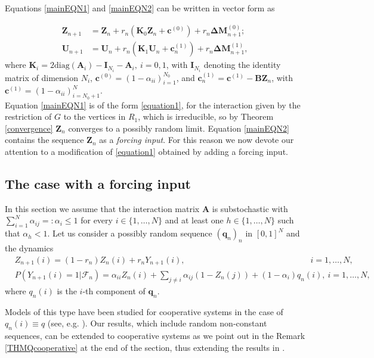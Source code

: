 \documentclass[article,12pt]{article}
\theoremstyle{plain}
\theoremstyle{definition}
\theoremstyle{remark}
\numberwithin{equation}{section}
\numberwithin{theorem}{section}
\begin{document}
		Equations \eqref{mainEQN1} and \eqref{mainEQN2} can be written in vector form as  
		
		\begin{align}\label{RED}
			\mathbf{Z}_{n+1}&=\mathbf{Z}_n+ r_n (\mathbf{K}_0\mathbf{Z}_n+\mathbf{c}^{(0)})+ r_n \mathbf{\Delta M}^{(0)}_{n+1};\\
			\mathbf{U}_{n+1}&=\mathbf{U}_n +r_n (\mathbf{K}_1\mathbf{U}_n+\mathbf{c}^{(1)}_n)+ r_n\mathbf{\Delta M}^{(1)}_{n+1},
		\end{align}
		where $\mathbf{K}_i=2 \mathrm{diag}(\mathbf{A}_i)-{\mathrm{\mathbf{I}}}_{N_i}-\mathbf{A}_i,\ i=0,1$, with  $\mathrm{\mathbf{I}}_{N_i}$ denoting the identity matrix of dimension $N_i$, $\mathbf{c}^{(0)}=(1-\alpha_{ii})_{i=1}^{N_0}$, and $\mathbf{c}_n^{(1)}=\mathbf{c}^{(1)}-\mathbf{B}\mathbf{Z}_n$, with $\mathbf{c}^{(1)}=(1-\alpha_{ii})_{i=N_0+1}^N$.\\
		Equation \eqref{mainEQN1} is of the form \eqref{equation1}, for the interaction given by the restriction of $G$ to the vertices in $R_1$, which is irreducible, so by Theorem \ref{convergence} $\mathbf{Z}_n$ converges to a possibly random limit. Equation \eqref{mainEQN2} contains the sequence $\mathbf{Z}_n$ as a {\em forcing input}. For this reason we now devote our attention to a modification of \eqref{equation1} obtained by adding a forcing input.
		
		\subsection{The case with a forcing input}\label{sec:competitiveforce}
		In this section we assume that the interaction matrix $\mathbf{A}$ is substochastic with $\sum_{i=1}^N\alpha_{ij}=:\alpha_{i}\leq 1$ for every $i\in \{1,\ldots, N\}$ and  at least one $h\in \{1,\ldots, N\}$ such that $\alpha_h<1$. Let us consider a possibly random sequence $(\mathbf{q}_n)_n$ in  $[0,1]^N$ and the dynamics
		\begin{align}\label{equation3}
			&Z_{n+1}(i)=(1-r_n)Z_n(i) + r_n Y_{n+1}(i) ,\qquad\qquad\qquad\qquad\qquad\qquad\qquad\quad i=1,\ldots, N,\\
			&P\left(Y_{n+1}(i)=1|\mathcal{F}_n\right) = \alpha_{ii}Z_n(i)+ \sum_{j\neq i}\alpha_{ij} \left(1-Z_n(j)\right)+(1-\alpha_i)q_{n}(i), \ i=1,\ldots, N,\nonumber
		\end{align}  
		where $q_{n}(i)$ is the $i$-th component of $\mathbf{q}_n$.                                              
		
		
		Models of this type have been  studied for cooperative systems in the case of $q_{n}(i) \equiv q$ (see, e.g. \cite{aletti2017synchronization}). Our results, which include random non-constant sequences, can be extended to cooperative systems as we point out in the Remark \ref{THMQcooperative} at the end of the section, thus extending the results in \cite{aletti2017synchronization}.\\ 
		
\end{document}

